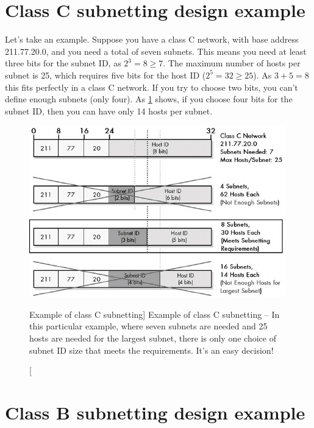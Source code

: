 \section{Class C subnetting design example}

Let's take an example.
Suppose you have a class C network, with base address 211.77.20.0, and you need a total of seven subnets.
This means you need at least three bits for the subnet ID, as $2^3=8\geqslant 7$.
The maximum number of hosts per subnet is 25, which requires five bits for the host ID ($2^5 = 32 \geqslant 25$).
As $3+5=8$ this fits perfectly in a class C network.
If you try to choose two bits, you can't define enough subnets (only four).
As \cref{fig:subnetting-class-c-options} shows, if you choose four bits for the subnet ID, then you can have only 14 hosts per subnet.

 
\begin{figure}
   \centering
   \includegraphics[width=.8\textwidth]{images/subnetting-class-c-options.jpg}
   \caption
      [Example of class C subnetting]
      {Example of class C subnetting --
      In this particular example, where seven subnets are needed and 25 hosts are needed for the largest subnet,
      there is only one choice of subnet ID size that meets the requirements. It's an easy decision!}
   \label{fig:subnetting-class-c-options}
\end{figure}

\section{Class B subnetting design example}

